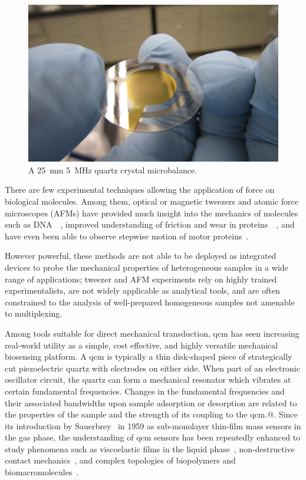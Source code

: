 \begin{figure}[ht]
 \centering
 \includegraphics[keepaspectratio,width=12cm]{qcm/figures/qcm_holding.jpg}
 \caption{A \SI{25}{\milli\meter} \SI{5}{\mega\hertz} quartz crystal microbalance.}
\label{fig:qcmholding}
\end{figure}
There are few experimental techniques allowing the application of force
on biological molecules. Among them, optical or magnetic tweezers and
atomic force microscopes (AFMs) have provided much insight into the
mechanics of molecules such as
DNA~\cite{cui2000pulling}~\cite{marko1995stretching}, improved
understanding of friction and wear in
proteins~\cite{suda2001origin}~\cite{bormuth2009protein}, and have even
been able to observe stepwise motion of motor
proteins~\cite{asbury2003kinesin}.

However powerful, these methods are not able to be deployed as integrated
devices to probe the mechanical properties of heterogeneous samples in a
wide range of applications; tweezer and AFM experiments rely on highly
trained experimentalists, are not widely applicable as analytical tools,
and are often constrained to the analysis of well-prepared homogeneous
samples not amenable to multiplexing.

Among tools suitable for direct mechanical transduction, \gls{qcm}
has seen increasing real-world utility as a simple, cost
effective, and highly versatile mechanical biosensing platform. A \gls{qcm} is
typically a thin disk-shaped piece of strategically cut piezoelectric
quartz with electrodes on either side. When part of an electronic
oscillator circuit, the quartz can form a mechanical resonator which
vibrates at certain fundamental frequencies. Changes in the fundamental
frequencies and their associated bandwidths upon sample adsorption or
desorption are related to the properties of the sample and the strength of
its coupling to the \gls{qcm}.@. Since its introduction by
Sauerbrey~\cite{sauerbrey1959verwendung} in 1959 as sub-monolayer thin-film
mass sensors in the gas phase, the understanding of \gls{qcm} sensors has been
repeatedly enhanced to study phenomena such as viscoelastic films in the
liquid phase~\cite{kanazawa1985frequency}, non-destructive contact
mechanics~\cite{johannsman2007contacts}, and complex topologies of
biopolymers and biomacromolecules~\cite{marx2003quartz}.


